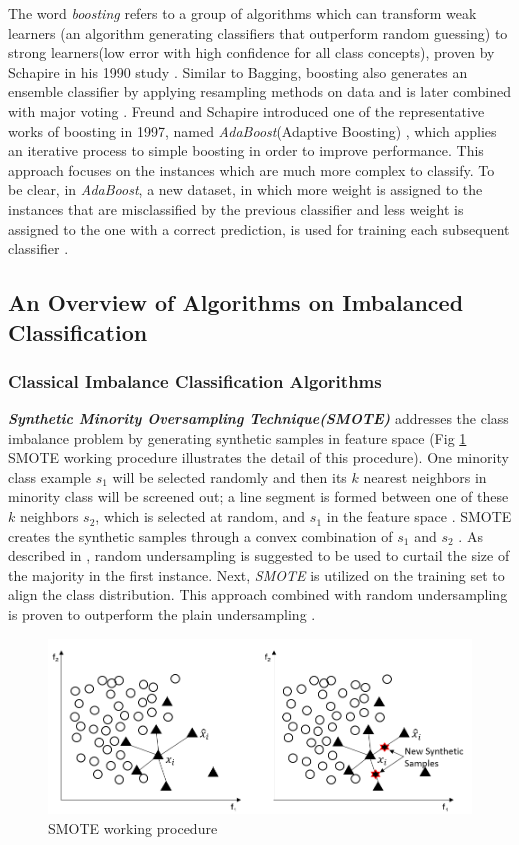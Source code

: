 The word \textit{boosting} refers to a group of algorithms which can transform weak learners (an algorithm generating classifiers that outperform random guessing) to strong learners(low error with high confidence for all class concepts), proven by Schapire in his 1990 study \cite{40}. Similar to Bagging, boosting also generates an ensemble classifier by applying resampling methods on data and is later combined with major voting \cite{26,38}. Freund and Schapire introduced one of the representative works of boosting in 1997, named \textit{AdaBoost}(Adaptive Boosting) \cite{41}, which applies an iterative process to simple boosting in order to improve performance. This approach focuses on the instances which are much more complex to classify. To be clear, in \textit{AdaBoost}, a new dataset, in which more weight is assigned to the instances that are misclassified by the previous classifier and less weight is assigned to the one with a correct prediction, is used for training each subsequent classifier \cite{42}.

\subsection{An Overview of Algorithms on Imbalanced Classification}
\subsubsection{Classical Imbalance Classification Algorithms}
\textbf{\textit{Synthetic Minority Oversampling Technique(SMOTE)}} \cite{13} addresses the class imbalance problem by generating synthetic samples in feature space (Fig \ref{fig3} SMOTE working procedure illustrates the detail of this procedure). One minority class example $s_{1}$ will be selected randomly and then its $k$ nearest neighbors in minority class will be screened out; a line segment is formed between one of these $k$ neighbors $s_{2}$, which is selected at random, and $s_{1}$ in the feature space \cite{13}. SMOTE creates the synthetic samples through a convex combination of $s_{1}$ and $s_{2}$ \cite{51}. As described in \cite{61}, random undersampling is suggested to be used to curtail the size of the majority in the first instance. Next, \textit{SMOTE} is utilized on the training set to align the class distribution. This approach combined with random undersampling is proven to outperform the plain undersampling \cite{13}. 
\begin{figure}[h]
    \centering
    \includegraphics[width=\textwidth]{images/fig3}
    \caption{SMOTE working procedure \cite{100}}
    \label{fig3}
\end{figure}

